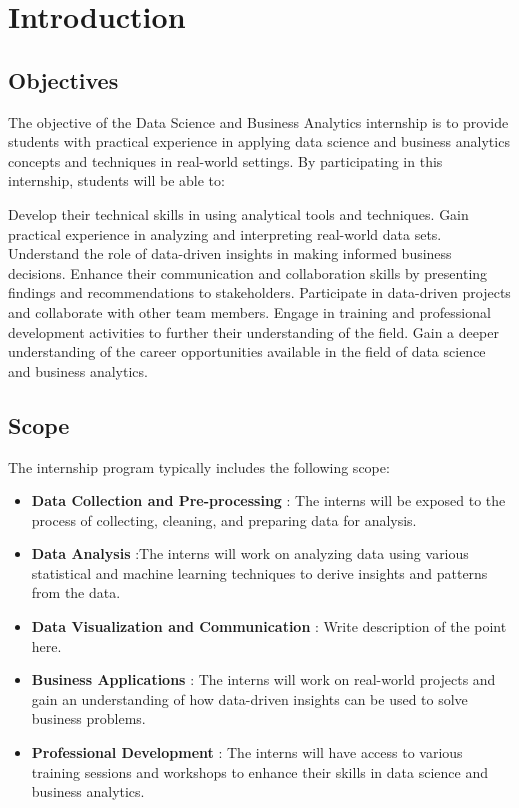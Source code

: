 \chapter{Introduction}
\justify
\quad 


\section{Objectives}
\justify 
\quad 
The objective of the Data Science and Business Analytics internship is to provide students with practical experience in applying data science and business analytics concepts and techniques in real-world settings. By participating in this internship, students will be able to:

Develop their technical skills in using analytical tools and techniques.
Gain practical experience in analyzing and interpreting real-world data sets.
Understand the role of data-driven insights in making informed business decisions.
Enhance their communication and collaboration skills by presenting findings and recommendations to stakeholders.
Participate in data-driven projects and collaborate with other team members.
Engage in training and professional development activities to further their understanding of the field.
Gain a deeper understanding of the career opportunities available in the field of data science and business analytics.


\section{Scope}
The internship program typically includes the following scope:
\begin{itemize}
\item \textbf{Data Collection and Pre-processing} : The interns will be exposed to the process of collecting, cleaning, and preparing data for analysis.
\item \textbf{Data Analysis} :The interns will work on analyzing data using various statistical and machine learning techniques to derive insights and patterns from the data.
\item \textbf{Data Visualization and Communication} : Write description of the point here.
\item \textbf{Business Applications} : The interns will work on real-world projects and gain an understanding of how data-driven insights can be used to solve business problems.
\item \textbf{Professional Development} : The interns will have access to various training sessions and workshops to enhance their skills in data science and business analytics.

\end{itemize}


\newpage


